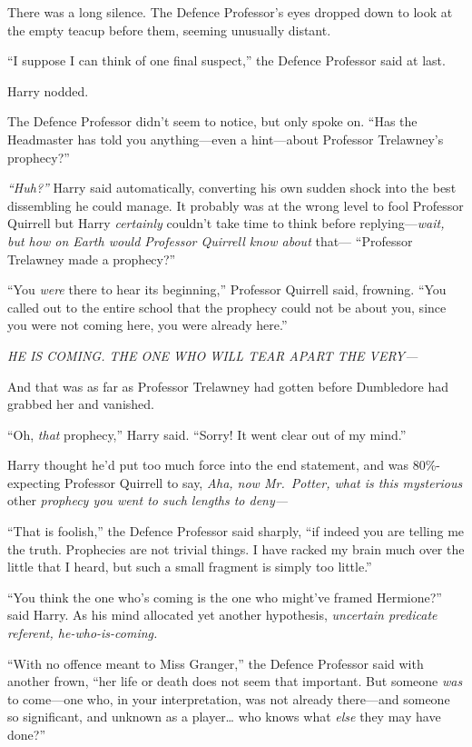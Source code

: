 There was a long silence. The Defence Professor's eyes dropped down to
look at the empty teacup before them, seeming unusually distant.

``I suppose I can think of one final suspect,'' the Defence Professor
said at last.

Harry nodded.

The Defence Professor didn't seem to notice, but only spoke on. ``Has
the Headmaster has told you anything---even a hint---about Professor
Trelawney's prophecy?''

\emph{``Huh?''} Harry said automatically, converting his own sudden
shock into the best dissembling he could manage. It probably was at the
wrong level to fool Professor Quirrell but Harry \emph{certainly}
couldn't take time to think before replying---\emph{wait, but how on
Earth would Professor Quirrell know about} that--- ``Professor Trelawney
made a prophecy?''

``You \emph{were} there to hear its beginning,'' Professor Quirrell
said, frowning. ``You called out to the entire school that the prophecy
could not be about you, since you were not coming here, you were already
here.''

\emph{HE IS COMING. THE ONE WHO WILL TEAR APART THE VERY---}

And that was as far as Professor Trelawney had gotten before Dumbledore
had grabbed her and vanished.

``Oh, \emph{that} prophecy,'' Harry said. ``Sorry! It went clear out of
my mind.''

Harry thought he'd put too much force into the end statement, and was
80\%-expecting Professor Quirrell to say, \emph{Aha, now Mr.~Potter,
what is this mysterious} other \emph{prophecy you went to such lengths
to deny---}

``That is foolish,'' the Defence Professor said sharply, ``if indeed you
are telling me the truth. Prophecies are not trivial things. I have
racked my brain much over the little that I heard, but such a small
fragment is simply too little.''

``You think the one who's coming is the one who might've framed
Hermione?'' said Harry. As his mind allocated yet another hypothesis,
\emph{uncertain predicate referent, he-who-is-coming.}

``With no offence meant to Miss Granger,'' the Defence Professor said
with another frown, ``her life or death does not seem that important.
But someone \emph{was} to come---one who, in your interpretation, was
not already there---and someone so significant, and unknown as a
player\ldots{} who knows what \emph{else} they may have done?''

